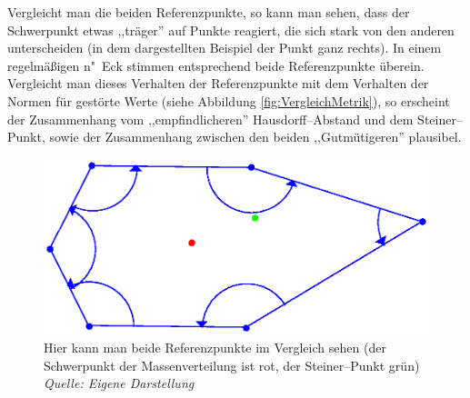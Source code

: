 Vergleicht man die beiden Referenzpunkte, so kann man sehen, dass der Schwerpunkt etwas ,,träger'' auf Punkte reagiert, die sich stark von den anderen unterscheiden (in dem dargestellten Beispiel der Punkt ganz rechts). In einem regelmäßigen n"~Eck stimmen entsprechend beide Referenzpunkte überein. Vergleicht man dieses Verhalten der Referenzpunkte mit dem Verhalten der Normen für gestörte Werte (siehe Abbildung \vref{fig:VergleichMetrik}), so erscheint der Zusammenhang vom ,,empfindlicheren'' Hausdorff--Abstand und dem  Steiner--Punkt, sowie der Zusammenhang zwischen den beiden ,,Gutmütigeren'' plausibel.

\begin{figure}
	\centering
	\includegraphics[scale=.8]{Referenzpunkte.eps}
	\caption[Vergleich beider Referenzpunkte]{Hier kann man beide Referenzpunkte im Vergleich sehen (der Schwerpunkt der Massenverteilung ist rot, der Steiner--Punkt grün) \\\textit{Quelle: Eigene Darstellung}}
	\label{fig:Referenzpunkte}
\end{figure}


